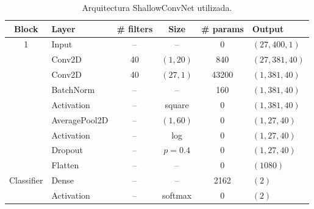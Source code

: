 \begin{table}[htbp]
    \centering
    \footnotesize
    \begin{tabular}{clcccl}
        \toprule
        \textbf{Block} & \textbf{Layer} & \textbf{\# filters} & \textbf{Size} & \textbf{\# params} & \textbf{Output}   \\
        \midrule
        1              & Input          & --                  & --            & 0                  & \((27, 400, 1)\)  \\

                       & Conv2D         & 40                  & \((1,20)\)    & 840                & \((27, 381, 40)\) \\

                       & Conv2D         & 40                  & \((27,1)\)    & 43200              & \((1, 381, 40)\)  \\

                       & BatchNorm      & --                  & --            & 160                & \((1, 381, 40)\)  \\

                       & Activation     & --                  & square        & 0                  & \((1, 381, 40)\)  \\

                       & AveragePool2D  & --                  & \((1,60)\)    & 0                  & \((1, 27, 40)\)   \\

                       & Activation     & --                  & log           & 0                  & \((1, 27, 40)\)   \\

                       & Dropout        & --                  & \(p = 0.4\)   & 0                  & \((1, 27, 40)\)   \\

                       & Flatten        & --                  & --            & 0                  & \((1080)\)        \\

        \midrule
        Classifier     & Dense          & --                  & --            & 2162               & \((2)\)           \\

                       & Activation     & --                  & softmax       & 0                  & \((2)\)           \\

        \bottomrule
    \end{tabular}
    \caption{Arquitectura ShallowConvNet utilizada.}
    \label{tab:shallowconvnet_architecture}
\end{table}

